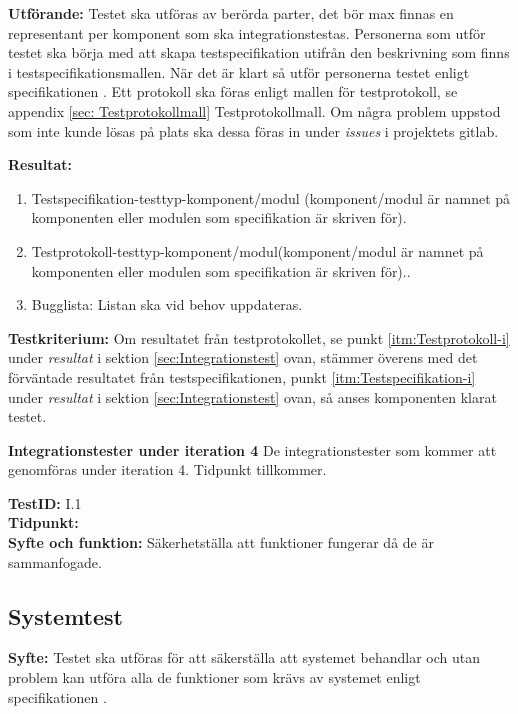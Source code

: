 \documentclass[a4paper,10pt, twoside]{article}
\begin{document}
\textbf{Utförande:}
Testet ska utföras av berörda parter, det bör max finnas en representant per komponent som ska integrationstestas. Personerna som utför testet ska börja med att skapa testspecifikation utifrån den beskrivning som finns i testspecifikationsmallen. När det är klart så utför personerna testet enligt specifikationen \cite{kravspec}. Ett protokoll ska föras enligt mallen för testprotokoll, se appendix \ref{sec: Testprotokollmall} Testprotokollmall. Om några problem uppstod som inte kunde lösas på plats ska dessa föras in under \emph{issues} i projektets gitlab.

\textbf{Resultat:}
\begin{enumerate}
	\item \label{itm:Testspecifikation-i} Testspecifikation-testtyp-komponent/modul (komponent/modul är namnet på komponenten eller modulen som 													  specifikation är skriven för).
    \item \label{itm:Testprotokoll-i} Testprotokoll-testtyp-komponent/modul(komponent/modul är namnet på komponenten eller modulen som specifikation är 										  skriven för)..
    \item Bugglista: Listan ska vid behov uppdateras.
\end{enumerate}

\textbf{Testkriterium:}
Om resultatet från testprotokollet, se punkt \ref{itm:Testprotokoll-i} under \emph{resultat} i sektion \ref{sec:Integrationstest} ovan, stämmer överens med det förväntade resultatet från testspecifikationen, punkt \ref{itm:Testspecifikation-i} under \emph{resultat} i sektion \ref{sec:Integrationstest} ovan, så anses komponenten klarat testet.

\textbf{Integrationstester under iteration 4}
De integrationstester som kommer att genomföras under iteration 4. Tidpunkt tillkommer.

\textbf{TestID:} I.1
\\ \textbf{Tidpunkt:}
\\ \textbf{Syfte och funktion:} Säkerhetställa att funktioner fungerar då de är sammanfogade.  


\subsection{Systemtest}
\label{sec:Systemtest}
\textbf{Syfte:} Testet ska utföras för att säkerställa att systemet behandlar och utan problem kan utföra alla de funktioner som krävs av systemet enligt specifikationen \cite{kravspec}.
\end{document}
